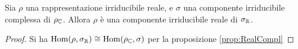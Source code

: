 	\begin{mylemma}
	 	Sia $\rho$ una rappresentazione irriducibile reale, e $\sigma$ una componente irriducibile complessa di $\rho_\mathbb C$. Allora $\rho$ è una componente irriducibile reale di $\sigma_\mathbb R$.
	\end{mylemma}

	\begin{proof}
	 	Si ha $\operatorname{Hom}(\rho,\sigma_\mathbb R)\cong\operatorname{Hom}(\rho_\mathbb C,\sigma)$ per la proposizione \ref{prop:RealCompl}
	\end{proof}

	
	
	
	
	
	
	
	
	
	
	
	
	
	
	
	